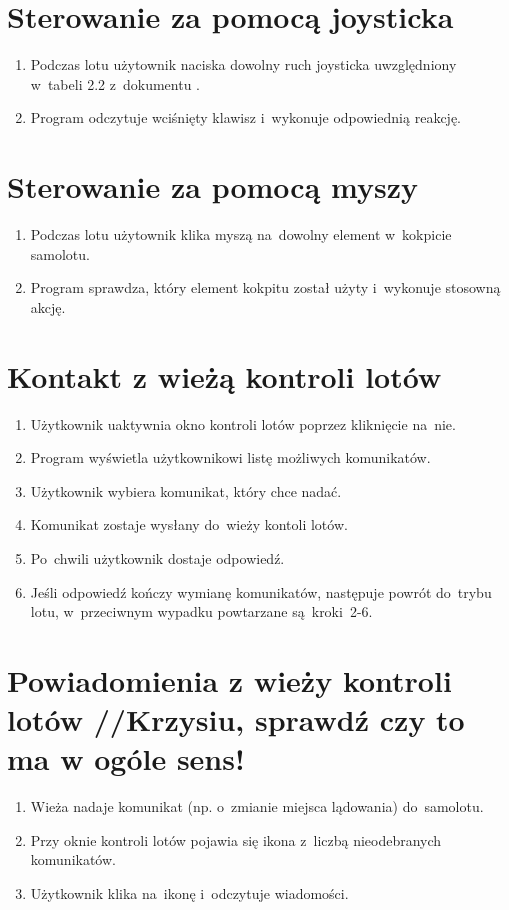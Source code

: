 \documentclass{mwrep}
\begin{document}
\section{Sterowanie za pomocą joysticka}
\begin{enumerate}
  \item Podczas lotu użytownik naciska dowolny ruch joysticka uwzględniony w~tabeli 2.2 z~dokumentu \cite{WYM}.
  \item Program odczytuje wciśnięty klawisz i~wykonuje odpowiednią reakcję.
\end{enumerate}

\section{Sterowanie za pomocą myszy}
\begin{enumerate}
  \item Podczas lotu użytownik klika myszą na~dowolny element w~kokpicie samolotu.
  \item Program sprawdza, który element kokpitu został użyty i~wykonuje stosowną akcję.
\end{enumerate}

\section{Kontakt z wieżą kontroli lotów}
\begin{enumerate}
  \item Użytkownik uaktywnia okno kontroli lotów poprzez kliknięcie na~nie.
  \item Program wyświetla użytkownikowi listę możliwych komunikatów.
  \item Użytkownik wybiera komunikat, który chce nadać.
  \item Komunikat zostaje wysłany do~wieży kontoli lotów.
  \item Po~chwili użytkownik dostaje odpowiedź.
  \item Jeśli odpowiedź kończy wymianę komunikatów, następuje powrót do~trybu lotu, w~przeciwnym wypadku powtarzane są~kroki~2-6.
\end{enumerate}

\section{Powiadomienia z wieży kontroli lotów //Krzysiu, sprawdź czy to ma w ogóle sens!}
\begin{enumerate}
  \item Wieża nadaje komunikat (np. o~zmianie miejsca lądowania) do~samolotu.
  \item Przy oknie kontroli lotów pojawia się ikona z~liczbą nieodebranych komunikatów.
  \item Użytkownik klika na~ikonę i~odczytuje wiadomości.
\end{enumerate}
\end{document}
